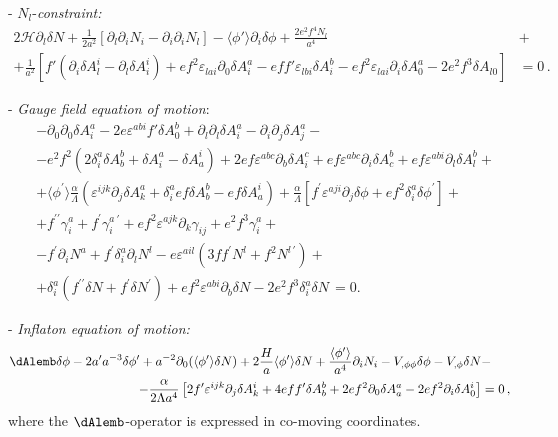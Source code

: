 \noindent - $N_l$-\textit{constraint:}
\begin{align}
2 \mathcal{H} \partial_l \delta N + \frac{1}{2 a^2} \left[ \partial_l \partial_i N_i - \partial_i \partial_i N_l \right] -\langle\phi'\rangle \partial_i \delta \phi  + \frac{ 2 e^2 f^4  N_l } {a^4} & + \nonumber \\
+ \frac{1}{a^2} \left[  f' \left( \partial_i \delta A^i_{l} -  \partial_l \delta A^i_{i} \right) + e f^2 \varepsilon_{lai} \partial_0 \delta A^a_{i} - e f f' \varepsilon_{lbi} \delta A^b_{i} - e f^2  \varepsilon_{lai} \partial_i \delta A^a_{0} - 2 e^2 f^3 \delta A_{l0}  \right] & = 0 \,.
\end{align}

\noindent - \textit{Gauge field equation of motion}:
\begin{align}
& -\partial_0 \partial_0 \delta A^a_i - 2 e \varepsilon^{abi} f' \delta A^b_0 + \partial_l \partial_l \delta A^a_i - \partial_i \partial_j \delta A^a_j - \nonumber \\
& - e^2 f^2 (2 \delta^a_i \delta A^b_b  +  \delta A^a_i -\delta A^i_a  ) + 2 e f \varepsilon^{abc} \partial_b \delta A^c_i + e f \varepsilon^{abc} \partial_i \delta A^b_c + e f \varepsilon^{abi} \partial_l \delta A^b_l + \nonumber \\
& + \langle \phi^\prime \rangle  \frac{\alpha}{\Lambda}  \left( \varepsilon^{ijk}  \partial_j \delta A^a_k +  \delta^a_i e f \delta A^b_b - ef \delta A^i_a \right)  + \frac{\alpha}{\Lambda} \left[  f^\prime \varepsilon^{aji}\partial_j \delta \phi  + e f^2 \delta^a_i \delta \phi^\prime  \right] + \nonumber \\
& + f^{\prime \prime} \gamma^{a}_i + f^{\prime} \gamma^{a \ \prime}_i + e f^2  \varepsilon^{ajk} \partial_k \gamma_{ij} + e^2 f^3 \gamma^a_{i} + \nonumber \\ 
& - f^{\prime } \partial_i  N^a +  f^{\prime } \delta^a_i \partial_l  N^l - e \varepsilon^{ail} (3 f f^{\prime} N^l + f^2 N^{l \, \prime} ) + \nonumber \\
& + \delta^a_i (f^{\prime \prime} \delta N + f^{\prime } \delta N^\prime ) + e f^2 \varepsilon^{abi} \partial_b \delta N - 2 e^2 f^3 \delta^a_i \delta N \,  = 0 . 
\end{align}

\noindent - \textit{Inflaton equation of motion:}
\begin{align}
\dAlemb \delta \phi - 2 a' a^{-3} \delta \phi' + a^{-2} \partial_0( \langle \phi' \rangle \delta N) +  2 \frac{H}{a} \langle \phi' \rangle \delta N  + \frac{\langle \phi' \rangle}{a^4} \partial_i N_i - V_{,\phi \phi} \delta \phi - V_{, \phi} \delta N & - \nonumber \\
- \frac{\alpha}{2 \Lambda a^4} \left[ 2 f' \varepsilon^{ijk} \partial_j \delta A^i_k + 4 e f f' \delta A^b_b + 2 e f^2 \partial_0 \delta A^a_a - 2 e f^2 \partial_i \delta A^i_0 \right] & = 0 \, ,
\end{align}
where the $\dAlemb$-operator is expressed in co-moving coordinates.

